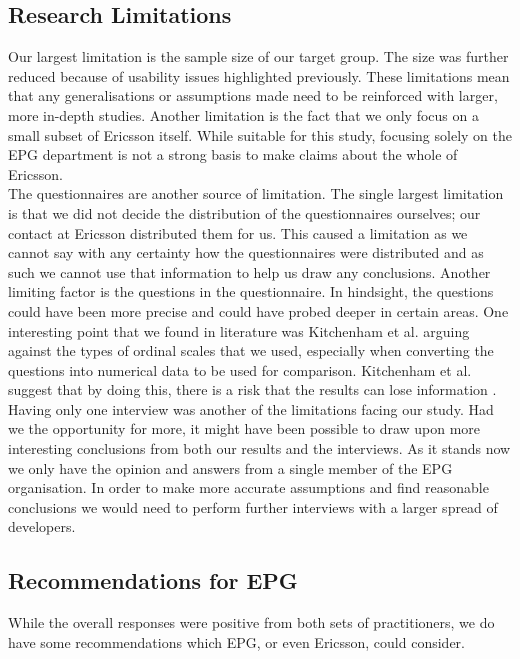 \documentclass[final_report_innit.tex]{subfiles}
\begin{document}
\subsection{Research Limitations}

Our largest limitation is the sample size of our target group. The size was further reduced because of usability issues highlighted previously. These limitations mean that any generalisations or assumptions made need to be reinforced with larger, more in-depth studies. Another limitation is the fact that we only focus on a small subset of Ericsson itself. While suitable for this study, focusing solely on the EPG department is not a strong basis to make claims about the whole of Ericsson.
\\

The questionnaires are another source of limitation. The single largest limitation is that we did not decide the distribution of the questionnaires ourselves; our contact at Ericsson distributed them for us. This caused a limitation as we cannot say with any certainty how the questionnaires were distributed and as such we cannot use that information to help us draw any conclusions. Another limiting factor is the questions in the questionnaire. In hindsight, the questions could have been more precise and could have probed deeper in certain areas. One interesting point that we found in literature was Kitchenham et al. \cite{kitchenham2003principles} arguing against the types of ordinal scales that we used, especially when converting the questions into numerical data to be used for comparison. Kitchenham et al. suggest that by doing this, there is a risk that the results can lose information \cite{kitchenham2003principles}.
\\

Having only one interview was another of the limitations facing our study. Had we the opportunity for more, it might have been possible to draw upon more interesting conclusions from both our results and the interviews. As it stands now we only have the opinion and answers from a single member of the EPG organisation. In order to make more accurate assumptions and find reasonable conclusions we would need to perform further interviews with a larger spread of developers.

\subsection{Recommendations for EPG}

While the overall responses were positive from both sets of practitioners, we do have some recommendations which EPG, or even Ericsson, could consider. 
\\
\end{document}
